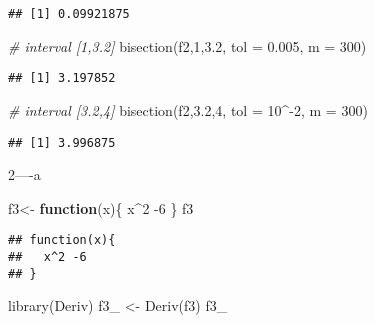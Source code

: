 \documentclass[
]{article}
\newenvironment{Shaded}{\begin{snugshade}}{\end{snugshade}}
\newcommand{\AttributeTok}[1]{\textcolor[rgb]{0.77,0.63,0.00}{#1}}
\newcommand{\CommentTok}[1]{\textcolor[rgb]{0.56,0.35,0.01}{\textit{#1}}}
\newcommand{\ControlFlowTok}[1]{\textcolor[rgb]{0.13,0.29,0.53}{\textbf{#1}}}
\newcommand{\DecValTok}[1]{\textcolor[rgb]{0.00,0.00,0.81}{#1}}
\newcommand{\FloatTok}[1]{\textcolor[rgb]{0.00,0.00,0.81}{#1}}
\newcommand{\FunctionTok}[1]{\textcolor[rgb]{0.00,0.00,0.00}{#1}}
\newcommand{\NormalTok}[1]{#1}
\newcommand{\OtherTok}[1]{\textcolor[rgb]{0.56,0.35,0.01}{#1}}
\newcommand{\SpecialCharTok}[1]{\textcolor[rgb]{0.00,0.00,0.00}{#1}}
\begin{document}
\begin{verbatim}
## [1] 0.09921875
\end{verbatim}

\begin{Shaded}
\begin{Highlighting}[]
\CommentTok{\# interval [1,3.2]}
\FunctionTok{bisection}\NormalTok{(f2,}\DecValTok{1}\NormalTok{,}\FloatTok{3.2}\NormalTok{, }\AttributeTok{tol =} \FloatTok{0.005}\NormalTok{, }\AttributeTok{m =} \DecValTok{300}\NormalTok{)}
\end{Highlighting}
\end{Shaded}

\begin{verbatim}
## [1] 3.197852
\end{verbatim}

\begin{Shaded}
\begin{Highlighting}[]
\CommentTok{\# interval [3.2,4]}
\FunctionTok{bisection}\NormalTok{(f2,}\FloatTok{3.2}\NormalTok{,}\DecValTok{4}\NormalTok{, }\AttributeTok{tol =} \DecValTok{10}\SpecialCharTok{\^{}{-}}\DecValTok{2}\NormalTok{, }\AttributeTok{m =} \DecValTok{300}\NormalTok{)}
\end{Highlighting}
\end{Shaded}

\begin{verbatim}
## [1] 3.996875
\end{verbatim}

2----a

\begin{Shaded}
\begin{Highlighting}[]
\NormalTok{f3}\OtherTok{\textless{}{-}} \ControlFlowTok{function}\NormalTok{(x)\{}
\NormalTok{  x}\SpecialCharTok{\^{}}\DecValTok{2} \SpecialCharTok{{-}}\DecValTok{6}
\NormalTok{\}}
\NormalTok{f3}
\end{Highlighting}
\end{Shaded}

\begin{verbatim}
## function(x){
##   x^2 -6
## }
\end{verbatim}

\begin{Shaded}
\begin{Highlighting}[]
\FunctionTok{library}\NormalTok{(Deriv)}
\NormalTok{f3\_ }\OtherTok{\textless{}{-}} \FunctionTok{Deriv}\NormalTok{(f3)}
\NormalTok{f3\_}
\end{Highlighting}
\end{Shaded}
\end{document}
